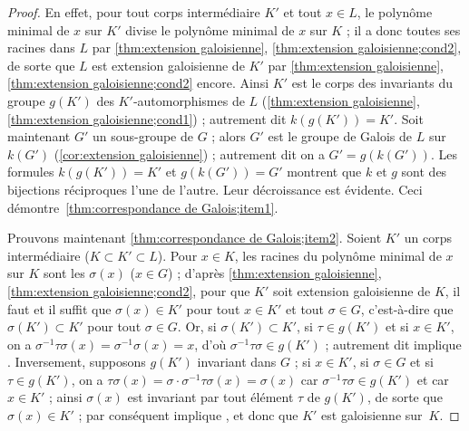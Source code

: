 \documentclass[11pt, %
  title in boldface,
  theorem in new line,
  theorem numbering = section,
  number theorems separately,
  simple name,
]{beaulivre}
\begin{document}
    \begin{proof}
        En effet, pour tout corps intermédiaire \( K' \) et tout \( x \in L \), le polynôme minimal de \( x \) sur \( K' \) divise le polynôme minimal de \( x \) sur \( K \) ; il a donc toutes ses racines dans \( L \) par \cref{thm:extension galoisienne}, \ref{thm:extension galoisienne;cond2}, de sorte que \( L \) est extension galoisienne de \( K' \) par \cref{thm:extension galoisienne}, \ref{thm:extension galoisienne;cond2} encore. Ainsi \( K' \) est le corps des invariants du groupe \( g(K') \) des \( K' \)‑automorphismes de \( L \) (\cref{thm:extension galoisienne}, \ref{thm:extension galoisienne;cond1}) ; autrement dit \( k(g(K')) = K' \). Soit maintenant \( G' \) un sous-groupe de \( G \) ; alors \( G' \) est le groupe de Galois de \( L \) sur \( k(G') \) (\cref{cor:extension galoisienne}) ; autrement dit on a \( G' = g(k(G')) \). Les formules \( k(g(K')) = K' \) et \( g(k(G')) = G' \) montrent que \( k \) et \( g \) sont des bijections réciproques l'une de l'autre. Leur décroissance est évidente. Ceci démontre~\ref{thm:correspondance de Galois;item1}.

        Prouvons maintenant \ref{thm:correspondance de Galois;item2}. Soient \( K' \) un corps intermédiaire (\( K \subset K' \subset L \)). Pour \( x \in K \), les racines du polynôme minimal de \( x \) sur \( K \) sont les \( \sigma(x) \) (\( x \in G \)) ; d'après \cref{thm:extension galoisienne}, \ref{thm:extension galoisienne;cond2}, pour que \( K' \) soit extension galoisienne de \( K \), il faut et il suffit que \( \sigma(x) \in K' \) pour tout \( x \in K' \) et tout \( \sigma \in G \), c'est-à-dire que \( \sigma(K') \subset K' \) pour tout \( \sigma \in G \). Or, si \( \sigma(K') \subset K' \), si \( \tau \in g(K') \) et si \( x \in K' \), on a \( \sigma^{-1} \tau \sigma(x) = \sigma^{-1} \sigma(x) = x \), d'où \( \sigma^{-1} \tau \sigma \in g(K') \) ; autrement dit  implique . Inversement, supposons \( g(K') \) invariant dans \( G \) ; si \( x \in K' \), si \( \sigma \in G \) et si \( \tau \in g(K') \), on a \( \tau \sigma(x) = \sigma \cdot \sigma^{-1} \tau \sigma(x) = \sigma(x) \) car \( \sigma^{-1} \tau \sigma \in g(K') \) et car \( x \in K' \) ; ainsi \( \sigma(x) \) est invariant par tout élément \( \tau \) de \( g(K') \), de sorte que \( \sigma(x) \in K' \) ; par conséquent  implique , et donc que \( K' \) est galoisienne sur~\( K \).


\end{proof}
\end{document}

